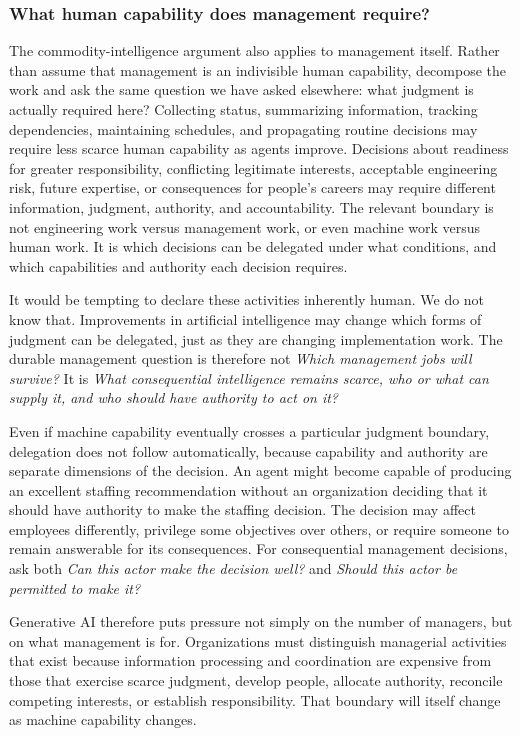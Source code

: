 \subsubsection{What human capability does management require?}\label{sec-management-capability}

The commodity-intelligence argument also applies to management itself. Rather than assume that
management is an indivisible human capability, decompose the work and ask the same question we have
asked elsewhere: what judgment is actually required here? Collecting status, summarizing
information, tracking dependencies, maintaining schedules, and propagating routine decisions may
require less scarce human capability as agents improve. Decisions about readiness for greater
responsibility, conflicting legitimate interests, acceptable engineering risk, future expertise, or
consequences for people's careers may require different information, judgment, authority, and
accountability. The relevant boundary is not engineering work versus management work, or even
machine work versus human work. It is which decisions can be delegated under what conditions, and
which capabilities and authority each decision requires.

It would be tempting to declare these activities inherently human. We do not know that.
Improvements in artificial intelligence may change which forms of judgment can be delegated, just
as they are changing implementation work. The durable management question is therefore not \emph{Which
management jobs will survive?} It is \emph{What consequential intelligence remains scarce, who or what
can supply it, and who should have authority to act on it?}

Even if machine capability eventually crosses a particular judgment boundary, delegation does not
follow automatically, because capability and authority are separate dimensions of the decision. An
agent might become capable of producing an excellent staffing recommendation without an
organization deciding that it should have authority to make the staffing decision. The decision may
affect employees differently, privilege some objectives over others, or require someone to remain
answerable for its consequences. For consequential management decisions, ask both \emph{Can this actor
make the decision well?} and \emph{Should this actor be permitted to make it?}

Generative AI therefore puts pressure not simply on the number of managers, but on what management
is for. Organizations must distinguish managerial activities that exist because information
processing and coordination are expensive from those that exercise scarce judgment, develop people,
allocate authority, reconcile competing interests, or establish responsibility. That boundary will
itself change as machine capability changes.

